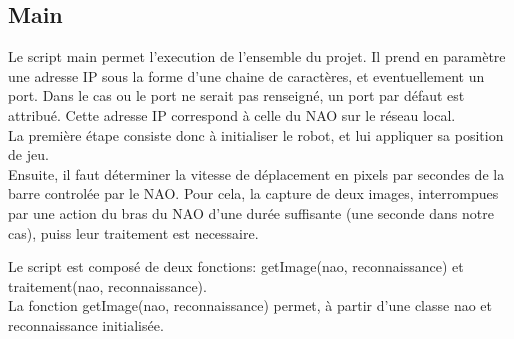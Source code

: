 \subsection{Main}
\label{sub:Main}

  \par Le script main permet l'execution de l'ensemble du projet.
  Il prend en paramètre une adresse IP sous la forme d'une chaine de caractères, et eventuellement un port.
  Dans le cas ou le port ne serait pas renseigné, un port par défaut est attribué.
  Cette adresse IP correspond à celle du NAO sur le réseau local.\\
  La première étape consiste donc à initialiser le robot, et lui appliquer sa position de jeu.\\
  Ensuite, il faut déterminer la vitesse de déplacement en pixels par secondes de la barre controlée par le NAO.
  Pour cela, la capture de deux images, interrompues par une action du bras du NAO d'une durée suffisante (une seconde dans notre cas), puiss leur traitement est necessaire.

  \par Le script est composé de deux fonctions: getImage(nao, reconnaissance) et traitement(nao, reconnaissance).\\
  La fonction getImage(nao, reconnaissance) permet, à partir d'une classe nao et reconnaissance initialisée.
